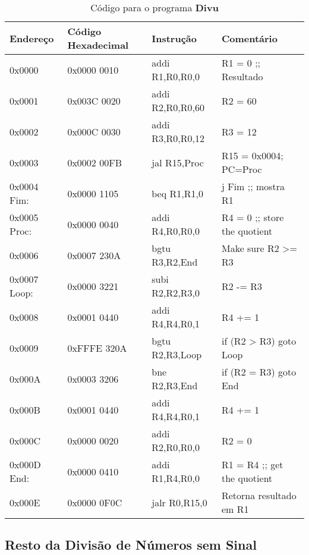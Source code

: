 \documentclass[12pt]{article}
\begin{document}
\begin{table}[H]
    \centering
    \caption{Código para o programa \textbf{Divu}}
    \begin{tabular}{|l|l|l|l|}\hline
        \textbf{Endereço} & \textbf{Código Hexadecimal} & \textbf{Instrução} & \textbf{Comentário} \\\hline
        0x0000       & 0x0000 0010 & addi R1,R0,R0,0  & R1 = 0 ;; Resultado           \\\hline
        0x0001       & 0x003C 0020 & addi R2,R0,R0,60 & R2 = 60                       \\\hline
        0x0002       & 0x000C 0030 & addi R3,R0,R0,12 & R3 = 12                       \\\hline
        0x0003       & 0x0002 00FB & jal R15,Proc     & R15 = 0x0004; PC=Proc         \\\hline
        0x0004 Fim:  & 0x0000 1105 & beq R1,R1,0      & j Fim ;; mostra R1            \\\hline
        0x0005 Proc: & 0x0000 0040 & addi R4,R0,R0,0  & R4 = 0 ;; store the quotient  \\\hline
        0x0006       & 0x0007 230A & bgtu R3,R2,End   & Make sure R2 >= R3            \\\hline
        0x0007 Loop: & 0x0000 3221 & subi R2,R2,R3,0  & R2 -= R3                      \\\hline
        0x0008       & 0x0001 0440 & addi R4,R4,R0,1  & R4 += 1                       \\\hline
        0x0009       & 0xFFFE 320A & bgtu R2,R3,Loop  & if (R2 > R3) goto Loop        \\\hline
        0x000A       & 0x0003 3206 & bne  R2,R3,End   & if (R2 \!= R3) goto End       \\\hline
        0x000B       & 0x0001 0440 & addi R4,R4,R0,1  & R4 += 1                       \\\hline
        0x000C       & 0x0000 0020 & addi R2,R0,R0,0  & R2 = 0                        \\\hline
        0x000D End:  & 0x0000 0410 & addi R1,R4,R0,0  & R1 = R4 ;; get the quotient   \\\hline
        0x000E       & 0x0000 0F0C & jalr R0,R15,0    & Retorna resultado em R1       \\\hline
    \end{tabular}\label{tab:programs:divu}
\end{table}

\subsection{Resto da Divisão de Números sem Sinal}\label{sec:programs:remu}
\end{document}
